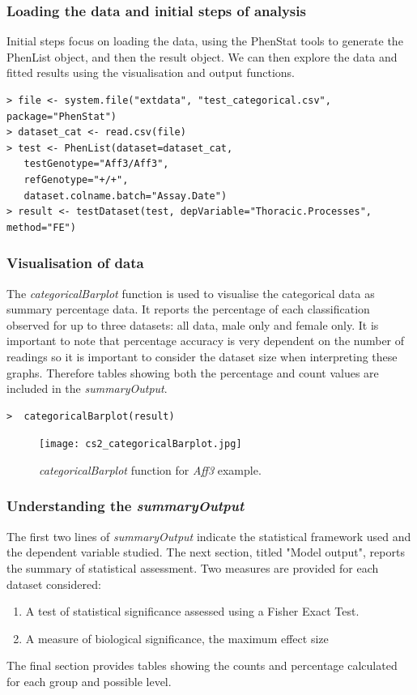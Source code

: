 \documentclass[12pt,a4paper]{article}
\begin{document}
\subsubsection{Loading the data and initial steps of analysis}
Initial steps focus on loading the data, using the PhenStat tools to generate the PhenList object, and then the result object.  We can then explore the data and fitted results using the visualisation and output functions.   

\begingroup
    \fontsize{8pt}{12pt}\selectfont
\begin{verbatim}
> file <- system.file("extdata", "test_categorical.csv", package="PhenStat") 
> dataset_cat <- read.csv(file)
> test <- PhenList(dataset=dataset_cat, 
   testGenotype="Aff3/Aff3", 
   refGenotype="+/+", 
   dataset.colname.batch="Assay.Date")
> result <- testDataset(test, depVariable="Thoracic.Processes", method="FE")
\end{verbatim}
\endgroup 

\subsubsection{Visualisation of data}
The \textit{categoricalBarplot} function is used to visualise the categorical data as summary percentage data. 
It reports the percentage of each classification observed for up to three datasets: all data, male only and female only.  
It is important to note that percentage accuracy is very dependent on the number of readings so it is important to consider the dataset size when interpreting these graphs.  
Therefore tables showing both the percentage and count values are included in the \textit{summaryOutput}. 

\begingroup
    \fontsize{8pt}{12pt}\selectfont
\begin{verbatim}
>  categoricalBarplot(result)
\end{verbatim}
\endgroup 

\begin{figure}[H]%
\centerline{\texttt{[image: cs2\_categoricalBarplot.jpg]}}
\caption{\textit{categoricalBarplot} function for \textit{Aff3} example.}\label{fig:24}
\end{figure}

\subsubsection{Understanding the \textit{summaryOutput}}

The first two lines of \textit{summaryOutput} indicate the statistical framework used and the dependent variable studied.  
The next section, titled "Model output", reports the summary of statistical assessment. Two measures are provided for each dataset considered:
\begin{enumerate}
\item A test of statistical significance assessed using a Fisher Exact Test. 
\item A measure of biological significance, the maximum effect size
\end{enumerate}
The final section provides tables showing the counts and percentage calculated for each group and possible level. 
\end{document}
